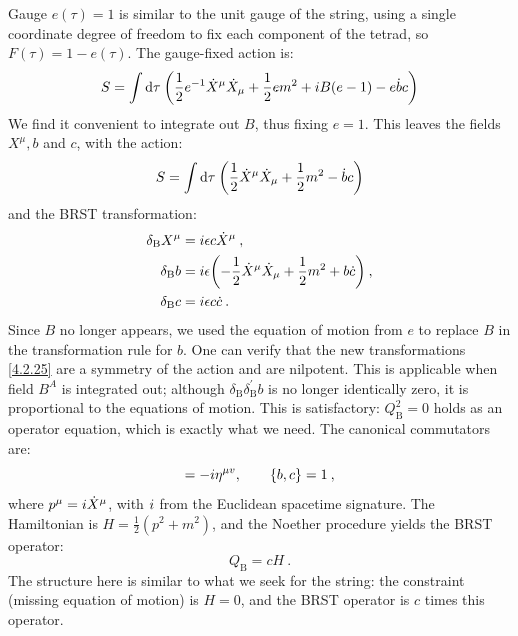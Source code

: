 Gauge $e(\tau)=1$ is similar to the unit gauge of the string, using a single coordinate degree of freedom to fix each component of the tetrad, so $F(\tau)=1-e(\tau)$. The gauge-fixed action is:
\begin{equation}
	S=\int \mathrm{d} \tau\: \biggl(\frac{1}{2} e^{-1} \dot{X}^{\mu} \dot{X}_{\mu}+\frac{1}{2} e m^{2}+i B(e-1)-e \dot{b} c\biggr) \label{4.2.23}
\end{equation}
We find it convenient to integrate out $B$, thus fixing $e=1$. This leaves the fields $X^{\mu}, b$ and $c$, with the action:
\begin{equation}
	S=\int \mathrm{d} \tau\:\biggl(\frac{1}{2} \dot{X}^{\mu} \dot{X}_{\mu}+\frac{1}{2} m^{2}-\dot{b} c\biggr)  \label{4.2.24}
\end{equation}
and the BRST transformation:
\begin{subequations}\label{4.2.25}
	\begin{align}
		\delta_{\mathrm{B}} X^{\mu}&=i \epsilon c \dot{X}^{\mu} \:, \label{4.2.25a} \\
		\delta_{\mathrm{B}} b&=i \epsilon\biggl(-\frac{1}{2} \dot{X}^{\mu} \dot{X}_{\mu}+\frac{1}{2} m^{2}+b\dot{c} \biggr) \:, \label{4.2.25b} \\
		\delta_{\mathrm{B}} c&=i \epsilon c \dot{c} \:. \label{4.2.25c}
	\end{align}
\end{subequations}
Since $B$ no longer appears, we used the equation of motion from $e$ to replace $B$ in the transformation rule for $b$. One can verify that the new transformations \eqref{4.2.25} are a symmetry of the action and are nilpotent. This is applicable when field $B^{A}$ is integrated out; although $\delta_{\mathrm{B}} \delta_{\mathrm{B}}^{\prime} b$ is no longer identically zero, it is proportional to the equations of motion. This is satisfactory: $Q_{\mathrm{B}}^{2}=0$ holds as an operator equation, which is exactly what we need. The canonical commutators are:
\begin{equation}
	[p^{\mu}, X^{v}]=-\mi \eta^{\mu v}, \qquad\{b, c\}=1 \:, \label{4.2.26}
\end{equation}
where $p^{\mu}=i \dot{X}^{\mu}$, with $i$ from the Euclidean spacetime signature. The Hamiltonian is $H=\frac{1}{2}\left(p^{2}+m^{2}\right)$, and the Noether procedure yields the BRST operator:
\begin{equation}
	Q_{\mathrm{B}}=c H \:. \label{4.2.27}
\end{equation}
The structure here is similar to what we seek for the string: the constraint (missing equation of motion) is $H=0$, and the BRST operator is $c$ times this operator.

